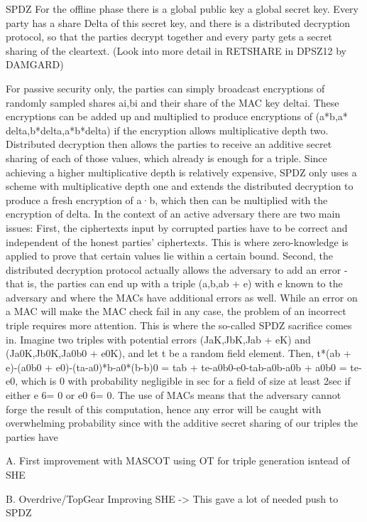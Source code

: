 \documentclass[english,runningheads,a4paper]{llncs}[2018/03/10]
\begin{document}
SPDZ
For the offline phase there is a global public key a global secret key. Every party has a share Delta of this secret key, and there is a distributed decryption protocol, so that the parties decrypt together and every party gets a secret sharing of the cleartext. (Look into more detail in RETSHARE in DPSZ12 by DAMGARD)

For passive security only, the parties can simply broadcast encryptions of randomly sampled shares ai,bi and their share of the MAC key deltai. These encryptions can be added up and multiplied to produce encryptions of (a*b,a* delta,b*delta,a*b*delta) if the encryption allows multiplicative depth two. Distributed decryption then allows the parties to receive an additive secret sharing of each of those values, which already is enough for a triple. Since achieving a higher multiplicative depth is relatively expensive, SPDZ only uses a scheme with multiplicative depth one and extends the distributed decryption to produce a fresh encryption of a·b, which then can be multiplied with the encryption of delta. In the context of an active adversary there are two main issues: First, the ciphertexts input by corrupted parties have to be correct and independent of the honest parties’ ciphertexts. This is where zero-knowledge is applied to prove that certain values lie within a certain bound. Second, the distributed decryption protocol actually allows the adversary to add an error - that is, the parties can end up with a triple (a,b,ab + e) with e known to the adversary and where the MACs have additional errors as well. While an error on a MAC will make the MAC check fail in any case, the problem of an incorrect triple requires more attention. This is where the so-called SPDZ sacrifice comes in. Imagine two triples with potential errors (JaK,JbK,Jab + eK) and (Ja0K,Jb0K,Ja0b0 + e0K), and let t be a random field element. Then, t*(ab + e)-(a0b0 + e0)-(ta-a0)*b-a0*(b-b)0 = tab + te-a0b0-e0-tab-a0b-a0b + a0b0 = te-e0, which is 0 with probability negligible in sec for a field of size at least 2sec if either e 6= 0 or e0 6= 0. The use of MACs means that the adversary cannot forge the result of this computation, hence any error will be caught with overwhelming probability since with the additive secret sharing of our triples the parties have





A. First improvement with MASCOT
using OT for triple generation isntead of SHE

B. Overdrive/TopGear
Improving SHE -> This gave a lot of needed push to SPDZ
\end{document}
